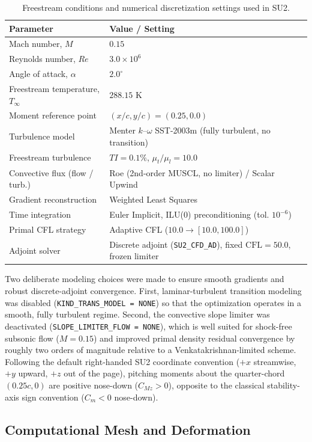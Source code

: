 \documentclass[11pt,a4paper]{article}
\begin{document}
\begin{table}[H]
\centering
\caption{Freestream conditions and numerical discretization settings used in SU2.}
\label{tab:solver_setup}
\begin{tabular}{ll}
\toprule
Parameter & Value / Setting \\
\midrule
Mach number, $M$ & $0.15$ \\
Reynolds number, $Re$ & $3.0 \times 10^6$ \\
Angle of attack, $\alpha$ & $2.0^\circ$ \\
Freestream temperature, $T_\infty$ & $288.15\text{ K}$ \\
Moment reference point & $(x/c, y/c) = (0.25, 0.0)$ \\
Turbulence model & Menter $k$--$\omega$ SST-2003m (fully turbulent, no transition) \\
Freestream turbulence & $TI = 0.1\%$, $\mu_t / \mu_l = 10.0$ \\
Convective flux (flow / turb.) & Roe (2nd-order MUSCL, no limiter) / Scalar Upwind \\
Gradient reconstruction & Weighted Least Squares \\
Time integration & Euler Implicit, ILU(0) preconditioning (tol. $10^{-6}$) \\
Primal CFL strategy & Adaptive CFL ($10.0 \to [10.0, 100.0]$) \\
Adjoint solver & Discrete adjoint (\texttt{SU2\_CFD\_AD}), fixed $\mathrm{CFL} = 50.0$, frozen limiter \\
\bottomrule
\end{tabular}
\end{table}

Two deliberate modeling choices were made to ensure smooth gradients and robust discrete-adjoint convergence. First, laminar-turbulent transition modeling was disabled (\texttt{KIND\_TRANS\_MODEL = NONE}) so that the optimization operates in a smooth, fully turbulent regime. Second, the convective slope limiter was deactivated (\texttt{SLOPE\_LIMITER\_FLOW = NONE}), which is well suited for shock-free subsonic flow ($M = 0.15$) and improved primal density residual convergence by roughly two orders of magnitude relative to a Venkatakrishnan-limited scheme.
Following the default right-handed SU2 coordinate convention ($+x$ streamwise, $+y$ upward, $+z$ out of the page), pitching moments about the quarter-chord $(0.25c, 0)$ are positive nose-down ($C_{Mz} > 0$), opposite to the classical stability-axis sign convention ($C_m < 0$ nose-down).
\subsection{Computational Mesh and Deformation}
\end{document}
